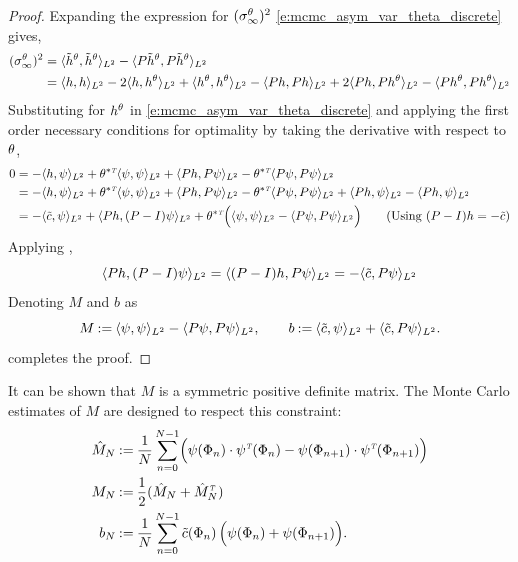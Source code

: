 \begin{proof}
	Expanding the expression for $(\sigma_\infty^\theta)^2$ \eqref{e:mcmc_asym_var_theta_discrete} gives,
	\begin{equation}
	\begin{aligned}
	(\asymvar^\param)^2 & = \langle \tilh^\param, \tilh^\param \rangle_{L^2} - \langle P \tilh^\param, P \tilh^\param \rangle_{L^2} \\
	& = \langle h, h \rangle_{L^2} - 2 \langle h, h^\param \rangle_{L^2} + \langle h^\param , h^\param \rangle_{L^2} - \langle P h, P h \rangle_{L^2} + 2 \langle P h , P h^\param \rangle_{L^2} - \langle P h ^\param , P h^\param \rangle_{L^2}
	\label{e:gamma_discrete}
	\end{aligned}
	\end{equation}
	Substituting for $h^\theta$ in \eqref{e:mcmc_asym_var_theta_discrete} and applying the first order necessary conditions for optimality by taking the derivative with respect to $\theta$,
	\begin{equation}
	\begin{aligned}
	0 & = - \langle h, \psi \rangle_{L^2} +  \param^{*\transpose} \langle \psi, \psi \rangle_{L^2}+ \langle P h, P \psi \rangle_{L^2}-\param^{*\transpose}  \langle P \psi, P  \psi \rangle_{L^2}  \\
	& = - \langle h, \psi \rangle_{L^2} +  \param^{*\transpose} \langle \psi, \psi \rangle_{L^2}+ \langle P h, P \psi \rangle_{L^2}-\param^{*\transpose}  \langle P \psi, P  \psi \rangle_{L^2}  + \langle P h, \psi \rangle_{L^2} - \langle P h, \psi \rangle_{L^2} \\
	& = - \langle \tilc , \psi \rangle_{L^2} + \langle P h, (P - I) \psi \rangle_{L^2} + \param^{*\transpose} \Bigl( \langle \psi, \psi \rangle_{L^2}  - \langle P \psi, P \psi \rangle_{L^2} \Bigr) \qquad \text{(Using $(P-I) h = -\tilc$)}
	\label{e:mcmc_gradient_reversible}
	\end{aligned}
	\end{equation}
	Applying ,
	\[
	\langle P h , (P -I) \psi \rangle_{L^2} = \langle (P - I) h, P \psi\rangle_{L^2} = - \langle \tilde c, P \psi \rangle_{L^2}
	\]
	Denoting $M$ and $b$ as
	\[
	M \mathbin{:=} \langle \psi, \psi \rangle_{L^2} - \langle P \psi, P \psi \rangle_{L^2}, \qquad b \mathbin{:=} \langle \tilde c, \psi \rangle_{L^2} + \langle \tilde c, P \psi \rangle_{L^2}.
	\]
	completes the proof.
\end{proof}
It can be shown that $M$ is a symmetric positive definite matrix. The Monte Carlo estimates of $M$ are designed to respect this constraint:
\[
\begin{aligned}
\hat{M}_N & \mathbin{:=} \frac{1}{N} \sum_{n=0}^{N-1} \Bigl(\psi(\Phi_n) \cdot\psi^{\hbox{\tiny\it T}}(\Phi_n) - \psi(\Phi_{n+1})\cdot \psi^{\hbox{\tiny\it T}}(\Phi_{n+1}) \Bigr) \\
M_N  & \mathbin{:=} \frac{1}{2} (\hat{M}_N + \hat{M}_N^{\hbox{\tiny\it T}} )\\
b_N & \mathbin{:=}  \frac{1}{N} \sum_{n=0}^{N-1} \tilde c(\Phi_n)\, \Bigl( \psi(\Phi_n) + \psi(\Phi_{n+1}) \Bigr).
\end{aligned}
\]

